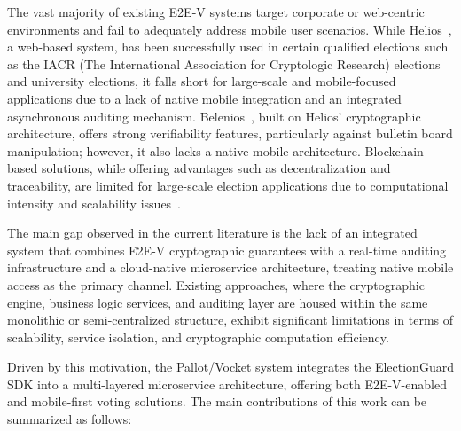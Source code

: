 \documentclass[a4paper,fleqn]{cas-sc}
\begin{document}
The vast majority of existing E2E-V systems target corporate or web-centric environments and fail to adequately address mobile user scenarios. While Helios~\cite{Adida2008}, a web-based system, has been successfully used in certain qualified elections such as the IACR (The International Association for Cryptologic Research) elections and university elections, it falls short for large-scale and mobile-focused applications due to a lack of native mobile integration and an integrated asynchronous auditing mechanism. Belenios~\cite{Cortier2019}, built on Helios' cryptographic architecture, offers strong verifiability features, particularly against bulletin board manipulation; however, it also lacks a native mobile architecture. Blockchain-based solutions, while offering advantages such as decentralization and traceability, are limited for large-scale election applications due to computational intensity and scalability issues~\cite{Zaghloul2021}.


The main gap observed in the current literature is the lack of an integrated system that combines E2E-V cryptographic guarantees with a real-time auditing infrastructure and a cloud-native microservice architecture, treating native mobile access as the primary channel. Existing approaches, where the cryptographic engine, business logic services, and auditing layer are housed within the same monolithic or semi-centralized structure, exhibit significant limitations in terms of scalability, service isolation, and cryptographic computation efficiency.


Driven by this motivation, the Pallot/Vocket system integrates the ElectionGuard SDK into a multi-layered microservice architecture, offering both E2E-V-enabled and mobile-first voting solutions. The main contributions of this work can be summarized as follows:
\end{document}

